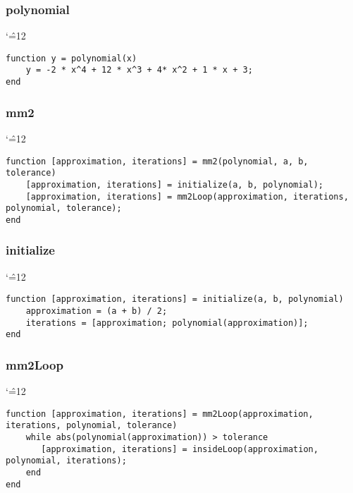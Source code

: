 \documentclass[12pt]{report}
\newenvironment{simplechar}{%
   \catcode`\^=12
}{}
\begin{document}
\subsubsection{polynomial}
\begin{simplechar}
\begin{lstlisting}
function y = polynomial(x)
    y = -2 * x^4 + 12 * x^3 + 4* x^2 + 1 * x + 3;
end

\end{lstlisting}
\end{simplechar}

\subsubsection{mm2}
\begin{simplechar}
\begin{lstlisting}
function [approximation, iterations] = mm2(polynomial, a, b, tolerance)
    [approximation, iterations] = initialize(a, b, polynomial);
    [approximation, iterations] = mm2Loop(approximation, iterations, polynomial, tolerance);
end
\end{lstlisting}
\end{simplechar}

\subsubsection{initialize}
\begin{simplechar}
\begin{lstlisting}
function [approximation, iterations] = initialize(a, b, polynomial)
    approximation = (a + b) / 2;
    iterations = [approximation; polynomial(approximation)];
end

\end{lstlisting}
\end{simplechar}

\subsubsection{mm2Loop}
\begin{simplechar}
\begin{lstlisting}
function [approximation, iterations] = mm2Loop(approximation, iterations, polynomial, tolerance)
    while abs(polynomial(approximation)) > tolerance
       [approximation, iterations] = insideLoop(approximation, polynomial, iterations);
    end
end
\end{lstlisting}
\end{simplechar}
\end{document}
